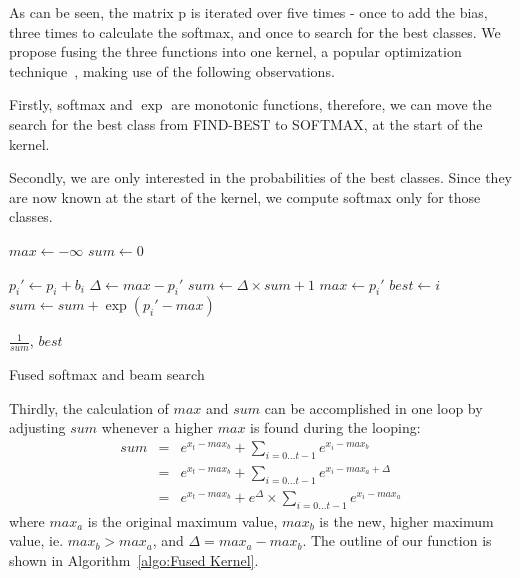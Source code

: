 \documentclass[11pt,a4paper]{article}
\begin{document}
As can be seen, the matrix p is iterated over five times - once to add the bias, three times to calculate the softmax, and once to search for the best classes. We propose fusing the three functions into one kernel, a popular optimization technique~\citep{Guevara2009EnablingTP}, making use of the following observations.

Firstly, softmax and $\exp$ are monotonic functions, therefore, we can move the search for the best class from FIND-BEST to SOFTMAX, at the start of the kernel.

Secondly, we are only interested in the probabilities of the best classes. Since they are now known at the start of the kernel, we compute softmax only for those classes.

\begin{algorithm}[ht]
\begin{algorithmic}


\State $max \gets - \infty$ 
\State $sum \gets 0$ 

  \State $p_i' \gets p_i + b_i$  
    \State $\Delta \gets max - p_i'$
    \State $sum \gets \Delta \times sum + 1 $
    \State $max \gets p_i'$
    \State $best \gets i$
  \Else
    \State $sum \gets sum + \exp(p_i' - max)$
  \EndIf
\EndFor

\Return $\frac{1}{sum}$, $best$ 

\EndProcedure
\end{algorithmic}

\caption{Fused softmax and beam search}
\label{algo:Fused Kernel}
\end{algorithm}

Thirdly, the calculation of $max$ and $sum$ can be accomplished in one loop by adjusting $sum$ whenever a higher $max$ is found during the looping:
\begin{eqnarray*}
sum & = & e^{x_t - max_b} + \sum_{i=0...t-1}{e^{x_i - max_b}} \\
    & = & e^{x_t - max_b} + \sum_{i=0...t-1}{e^{x_i - max_a + \Delta}}  \\
    & = & e^{x_t - max_b} + e^{\Delta} \times \sum_{i=0...t-1}{e^{x_i - max_a}} 
\end{eqnarray*}
where $max_a$ is the original maximum value, $max_b$ is the new, higher maximum value, ie. $max_b > max_a$, and $\Delta = max_a - max_b$. The outline of our function is shown in Algorithm~\ref{algo:Fused Kernel}.
\end{document}
